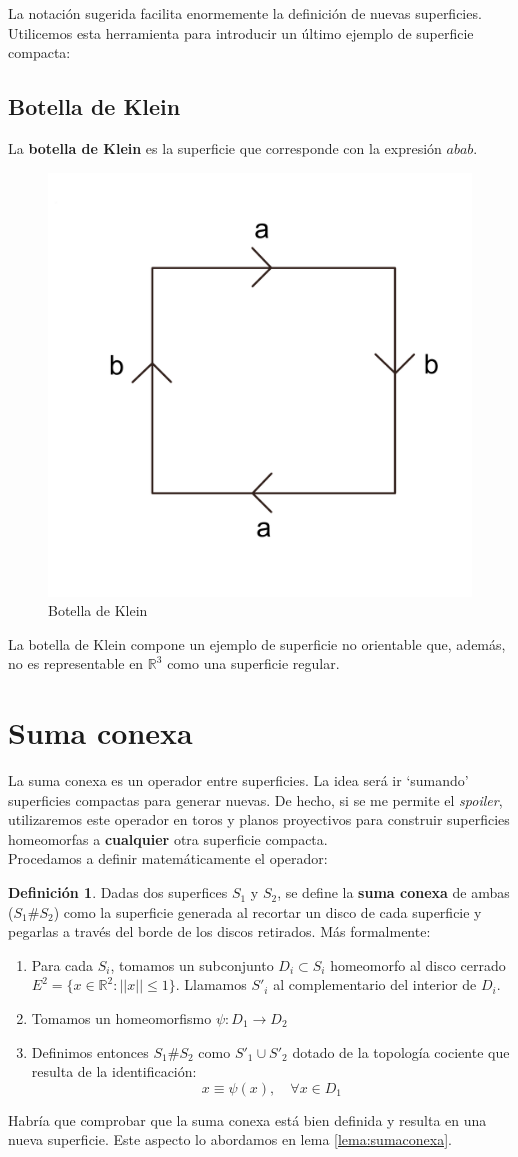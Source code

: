 \documentclass[a4paper,11pt,spanish, twoside, leqno]{tfg-uam}
\newcommand*{\reales}{\mathbb{R}}
\theoremstyle{definition}
\newtheorem{defin}[teor]{Definici\'on}
\begin{document}
La notación sugerida facilita enormemente la definición de nuevas superficies. Utilicemos esta herramienta para introducir un último ejemplo de superficie compacta:


\subsection*{Botella de Klein}
La \textbf{botella de Klein} es la superficie que corresponde con la expresión $ abab $.
\begin{figure}[h!]
	\centering
	\includegraphics[width=0.2\linewidth]{imagenes/klein.png}
	\caption{Botella de Klein}
	\label{fig:botelladeklein expresion canónica}
\end{figure} 

La botella de Klein compone un ejemplo de superficie no orientable que, además, no es representable en $\reales^3$ como una superficie regular.

\section{Suma conexa}

La suma conexa es un operador entre superficies. La idea será ir `sumando' superficies compactas para generar nuevas. De hecho, si se me permite el \textit{spoiler}, utilizaremos este operador en toros y planos proyectivos para construir superficies homeomorfas a \textbf{cualquier} otra superficie compacta.\\
Procedamos a definir matemáticamente el operador:

\begin{defin}\label{defin:sumaconexa}
Dadas dos superfices $S_1$ y $S_2$, se define la \textbf{suma conexa} de ambas ($S_1\#S_2$) como la superficie generada al recortar un disco de cada superficie y pegarlas a través del borde de los discos retirados. Más formalmente:
\begin{enumerate}
\item  Para cada $S_i$, tomamos un subconjunto $D_i\subset S_i$ homeomorfo al disco cerrado $E^2=\{x\in\mathbb{R}^2: ||x||\leq 1\}$. Llamamos $S'_i$ al complementario del interior de $D_i$.

\item Tomamos un homeomorfismo $\psi:D_1\longrightarrow D_2$

\item Definimos entonces $S_1\#S_2$ como $S'_1\cup S'_2$ dotado de la topología cociente que resulta de la identificación:
\[ x \equiv  \psi(x), \quad \forall x \in D_1 \] 
\end{enumerate}
Habría que comprobar que la suma conexa está bien definida y resulta en una nueva superficie. Este aspecto lo abordamos en lema \ref{lema:sumaconexa}.
\end{defin}
\end{document}
